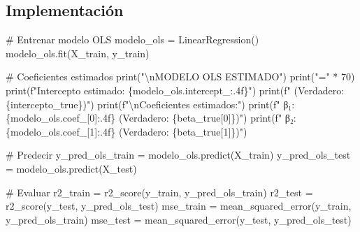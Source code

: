 \documentclass[
  doc,
  floatsintext,
  longtable,
  a4paper,
  nolmodern,
  notxfonts,
  notimes,
  12pt,
  colorlinks=true,linkcolor=blue,citecolor=blue,urlcolor=blue]{apa7}
\newenvironment{Shaded}{\begin{snugshade}}{\end{snugshade}}
\newcommand{\BuiltInTok}[1]{\textcolor[rgb]{0.00,0.23,0.31}{#1}}
\newcommand{\CharTok}[1]{\textcolor[rgb]{0.13,0.47,0.30}{#1}}
\newcommand{\CommentTok}[1]{\textcolor[rgb]{0.37,0.37,0.37}{#1}}
\newcommand{\DecValTok}[1]{\textcolor[rgb]{0.68,0.00,0.00}{#1}}
\newcommand{\NormalTok}[1]{\textcolor[rgb]{0.00,0.23,0.31}{#1}}
\newcommand{\OperatorTok}[1]{\textcolor[rgb]{0.37,0.37,0.37}{#1}}
\newcommand{\SpecialCharTok}[1]{\textcolor[rgb]{0.37,0.37,0.37}{#1}}
\newcommand{\SpecialStringTok}[1]{\textcolor[rgb]{0.13,0.47,0.30}{#1}}
\newcommand{\StringTok}[1]{\textcolor[rgb]{0.13,0.47,0.30}{#1}}
\begin{document}
\subsection{Implementación}\label{implementaciuxf3n}

\begin{Shaded}
\begin{Highlighting}[]
\CommentTok{\# Entrenar modelo OLS}
\NormalTok{modelo\_ols }\OperatorTok{=}\NormalTok{ LinearRegression()}
\NormalTok{modelo\_ols.fit(X\_train, y\_train)}

\CommentTok{\# Coeficientes estimados}
\BuiltInTok{print}\NormalTok{(}\StringTok{"}\CharTok{\textbackslash{}n}\StringTok{MODELO OLS ESTIMADO"}\NormalTok{)}
\BuiltInTok{print}\NormalTok{(}\StringTok{"="} \OperatorTok{*} \DecValTok{70}\NormalTok{)}
\BuiltInTok{print}\NormalTok{(}\SpecialStringTok{f"Intercepto estimado: }\SpecialCharTok{\{}\NormalTok{modelo\_ols}\SpecialCharTok{.}\NormalTok{intercept\_}\SpecialCharTok{:.4f\}}\SpecialStringTok{"}\NormalTok{)}
\BuiltInTok{print}\NormalTok{(}\SpecialStringTok{f"  (Verdadero: }\SpecialCharTok{\{}\NormalTok{intercepto\_true}\SpecialCharTok{\}}\SpecialStringTok{)"}\NormalTok{)}
\BuiltInTok{print}\NormalTok{(}\SpecialStringTok{f"}\CharTok{\textbackslash{}n}\SpecialStringTok{Coeficientes estimados:"}\NormalTok{)}
\BuiltInTok{print}\NormalTok{(}\SpecialStringTok{f"  β₁: }\SpecialCharTok{\{}\NormalTok{modelo\_ols}\SpecialCharTok{.}\NormalTok{coef\_[}\DecValTok{0}\NormalTok{]}\SpecialCharTok{:.4f\}}\SpecialStringTok{ (Verdadero: }\SpecialCharTok{\{}\NormalTok{beta\_true[}\DecValTok{0}\NormalTok{]}\SpecialCharTok{\}}\SpecialStringTok{)"}\NormalTok{)}
\BuiltInTok{print}\NormalTok{(}\SpecialStringTok{f"  β₂: }\SpecialCharTok{\{}\NormalTok{modelo\_ols}\SpecialCharTok{.}\NormalTok{coef\_[}\DecValTok{1}\NormalTok{]}\SpecialCharTok{:.4f\}}\SpecialStringTok{ (Verdadero: }\SpecialCharTok{\{}\NormalTok{beta\_true[}\DecValTok{1}\NormalTok{]}\SpecialCharTok{\}}\SpecialStringTok{)"}\NormalTok{)}

\CommentTok{\# Predecir}
\NormalTok{y\_pred\_ols\_train }\OperatorTok{=}\NormalTok{ modelo\_ols.predict(X\_train)}
\NormalTok{y\_pred\_ols\_test }\OperatorTok{=}\NormalTok{ modelo\_ols.predict(X\_test)}

\CommentTok{\# Evaluar}
\NormalTok{r2\_train }\OperatorTok{=}\NormalTok{ r2\_score(y\_train, y\_pred\_ols\_train)}
\NormalTok{r2\_test }\OperatorTok{=}\NormalTok{ r2\_score(y\_test, y\_pred\_ols\_test)}
\NormalTok{mse\_train }\OperatorTok{=}\NormalTok{ mean\_squared\_error(y\_train, y\_pred\_ols\_train)}
\NormalTok{mse\_test }\OperatorTok{=}\NormalTok{ mean\_squared\_error(y\_test, y\_pred\_ols\_test)}


\end{Highlighting}
\end{Shaded}
\end{document}
